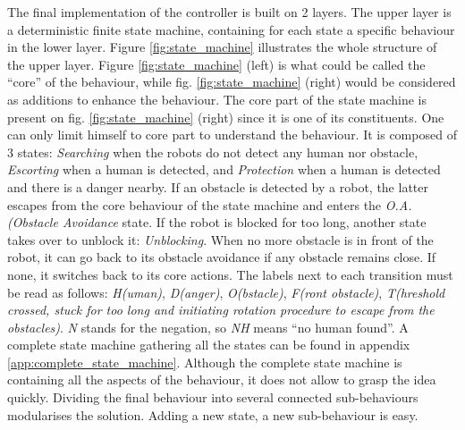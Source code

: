 \documentclass[oneside, a4paper, 12pt]{memoir}
\begin{document}
	The final implementation of the controller is built on 2 layers. The upper layer is a deterministic finite state machine, containing for each state a specific behaviour in the lower layer. Figure \ref{fig:state_machine} illustrates the whole structure of the upper layer. Figure \ref{fig:state_machine} (left) is what could be called the \enquote{core} of the behaviour, while fig. \ref{fig:state_machine} (right) would be considered as additions to enhance the behaviour. The core part of the state machine is present on fig. \ref{fig:state_machine} (right) since it is one of its constituents. One can only limit himself to core part to understand the behaviour. It is composed of 3 states: \emph{Searching} when the robots do not detect any human nor obstacle, \emph{Escorting} when a human is detected, and \emph{Protection} when a human is detected and there is a danger nearby. If an obstacle is detected by a robot, the latter escapes from the core behaviour of the state machine and enters the \emph{O.A. (Obstacle Avoidance} state. If the robot is blocked for too long, another state takes over to unblock it: \emph{Unblocking}. When no more obstacle is in front of the robot, it can go back to its obstacle avoidance if any obstacle remains close. If none, it switches back to its core actions. The labels next to each transition must be read as follows: \emph{H(uman)}, \emph{D(anger)}, \emph{O(bstacle)}, \emph{F(ront obstacle)}, \emph{T(hreshold crossed, stuck for too long and initiating rotation procedure to escape from the obstacles)}. \emph{N} stands for the negation, so \emph{NH} means \enquote{no human found}. A complete state machine gathering all the states can be found in appendix \ref{app:complete_state_machine}. Although the complete state machine is containing all the aspects of the behaviour, it does not allow to grasp the idea quickly. Dividing the final behaviour into several connected sub-behaviours modularises the solution. Adding a new state, a new sub-behaviour is easy.\\
	
\end{document}
